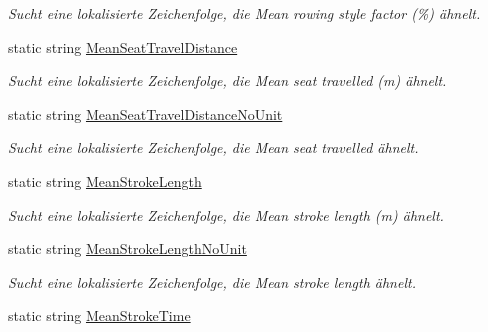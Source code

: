 \begin{DoxyCompactItemize}
\begin{DoxyCompactList}\small\item\em Sucht eine lokalisierte Zeichenfolge, die Mean rowing style factor (\%) ähnelt. \end{DoxyCompactList}\item 
static string \hyperlink{class_rowing_monitor_1_1_properties_1_1_resources_ac34d72eb29be8388d7d551b906bf0995}{Mean\+Seat\+Travel\+Distance}
\begin{DoxyCompactList}\small\item\em Sucht eine lokalisierte Zeichenfolge, die Mean seat travelled (m) ähnelt. \end{DoxyCompactList}\item 
static string \hyperlink{class_rowing_monitor_1_1_properties_1_1_resources_aaf9cf68364cf633ed99b1b808e635f71}{Mean\+Seat\+Travel\+Distance\+No\+Unit}
\begin{DoxyCompactList}\small\item\em Sucht eine lokalisierte Zeichenfolge, die Mean seat travelled ähnelt. \end{DoxyCompactList}\item 
static string \hyperlink{class_rowing_monitor_1_1_properties_1_1_resources_a704f021aad75ca92700dfe7cdb189670}{Mean\+Stroke\+Length}
\begin{DoxyCompactList}\small\item\em Sucht eine lokalisierte Zeichenfolge, die Mean stroke length (m) ähnelt. \end{DoxyCompactList}\item 
static string \hyperlink{class_rowing_monitor_1_1_properties_1_1_resources_a66d57a4a758dcf565c5aa1422ab3b1f1}{Mean\+Stroke\+Length\+No\+Unit}
\begin{DoxyCompactList}\small\item\em Sucht eine lokalisierte Zeichenfolge, die Mean stroke length ähnelt. \end{DoxyCompactList}\item 
static string \hyperlink{class_rowing_monitor_1_1_properties_1_1_resources_a880c3e3f52ed32f7e09fb5dde7f7220a}{Mean\+Stroke\+Time}

\end{DoxyCompactItemize}
